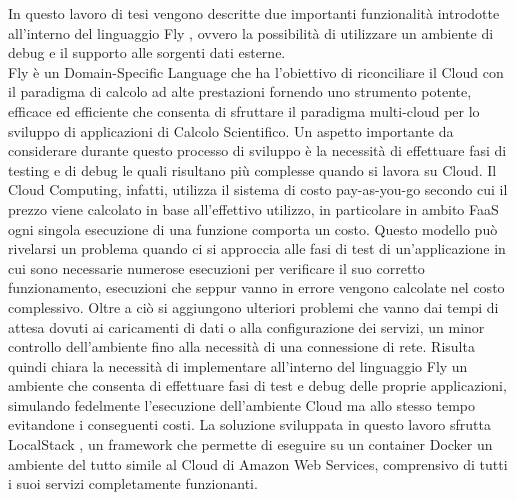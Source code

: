 In questo lavoro di tesi vengono descritte due importanti funzionalità introdotte all'interno del linguaggio Fly \cite{ISISLab}, ovvero la possibilità di utilizzare un ambiente di debug e il supporto alle sorgenti dati esterne.\\
Fly è un Domain-Specific Language che ha l’obiettivo di riconciliare il Cloud con il paradigma di calcolo ad alte prestazioni fornendo uno strumento potente, efficace ed efficiente che consenta di sfruttare il paradigma multi-cloud per lo sviluppo di applicazioni di Calcolo Scientifico. Un aspetto importante da considerare durante questo processo di sviluppo è la necessità di effettuare fasi di testing e di debug le quali risultano più complesse quando si lavora su Cloud. Il Cloud Computing, infatti, utilizza il sistema di costo pay-as-you-go secondo cui il prezzo viene calcolato in base all'effettivo utilizzo, in particolare in ambito FaaS ogni singola esecuzione di una funzione comporta un costo. Questo modello può rivelarsi un problema quando ci si approccia alle fasi di test di un'applicazione in cui sono necessarie numerose esecuzioni per verificare il suo corretto funzionamento, esecuzioni che seppur vanno in errore vengono calcolate nel costo complessivo. Oltre a ciò si aggiungono ulteriori problemi che vanno dai tempi di attesa dovuti ai caricamenti di dati o alla configurazione dei servizi, un minor controllo dell'ambiente fino alla necessità di una connessione di rete. Risulta quindi chiara la necessità di implementare all'interno del linguaggio Fly un ambiente che consenta di effettuare fasi di test e debug delle proprie applicazioni, simulando fedelmente l'esecuzione dell'ambiente Cloud ma allo stesso tempo evitandone i conseguenti costi. La soluzione sviluppata in questo lavoro sfrutta LocalStack \cite{LocalStack}, un framework che permette di eseguire su un container Docker \cite{docker} un ambiente del tutto simile al Cloud di Amazon Web Services, comprensivo di tutti i suoi servizi completamente funzionanti.\\
